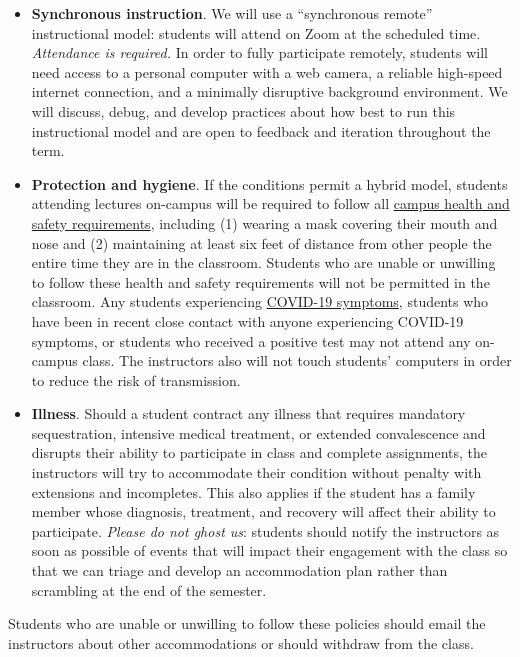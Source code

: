 \documentclass[10pt]{memoir}
\begin{document}
\begin{itemize}[itemsep=0pt,leftmargin=1em]
    \item \textbf{Synchronous instruction}. 
    We will use a ``synchronous remote'' instructional model: students will attend on Zoom at the scheduled time. \textit{Attendance is required.} In order to fully participate remotely, students will need access to a personal computer with a web camera, a reliable high-speed internet connection, and a minimally disruptive background environment. We will discuss, debug, and develop practices about how best to run this instructional model and are open to feedback and iteration throughout the term. %
    
    \item \textbf{Protection and hygiene}. If the conditions permit a hybrid model, students attending lectures on-campus will be required to follow all \href{https://www.colorado.edu/protect-our-herd/}{campus health and safety requirements}, including (1) wearing a mask covering their mouth and nose and (2) maintaining at least six feet of distance from other people the entire time they are in the classroom. Students who are unable or unwilling to follow these health and safety requirements will not be permitted in the classroom. Any students experiencing \href{https://www.cdc.gov/coronavirus/2019-ncov/symptoms-testing/symptoms.html}{COVID-19 symptoms}, students who have been in recent close contact with anyone experiencing COVID-19 symptoms, or students who received a positive test may not attend any on-campus class. The instructors also will not touch students' computers in order to reduce the risk of transmission. 
    
    \item \textbf{Illness}. Should a student contract any illness that requires mandatory sequestration, intensive medical treatment, or extended convalescence and disrupts their ability to participate in class and complete assignments, the instructors will try to accommodate their condition without penalty with extensions and incompletes. This also applies if the student has a family member whose diagnosis, treatment, and recovery will affect their ability to participate. \textit{Please do not ghost us}: students should notify the instructors as soon as possible of events that will impact their engagement with the class so that we can triage and develop an accommodation plan rather than scrambling at the end of the semester.
\end{itemize}
\noindent Students who are unable or unwilling to follow these policies should email the instructors about other accommodations or should withdraw from the class.
\end{document}
